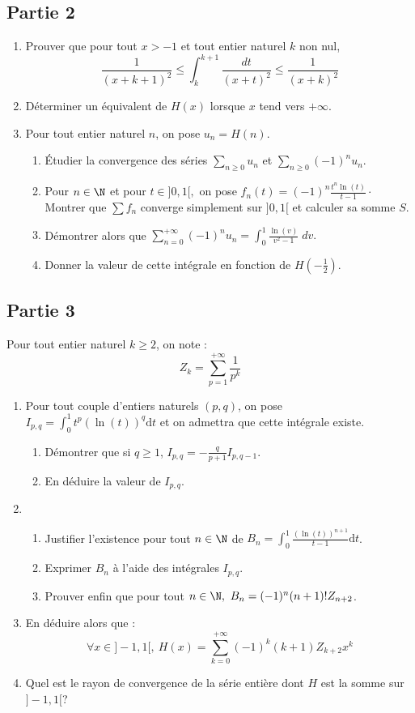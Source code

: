 \documentclass[twoside,french,11pt]{VcCours}
\newcommand{\dt}{\text{d}t}
\begin{document}
\subsection*{Partie 2}

\begin{enumerate}
\item Prouver que pour tout $x>-1$ et tout entier naturel $k$ non nul,
\[\frac{1}{(x+k+1)^2}\leq \int_k^{k+1}\frac{dt}{(x+t)^2}\leq \frac{1}{(x+k)^2}\]
\item Déterminer un équivalent de $H(x)$ lorsque $x$ tend vers $+\infty$.
\item Pour tout entier naturel $n$, on pose $u_n=H(n)$.
\begin{enumerate}
\item Étudier la convergence des séries $\sum_{n\geq 0}u_n$ et $\sum_{n\geq 0}(-1)^nu_n$.
\item Pour $n\in\N$ et pour $t\in]0,1[,$ on pose $f_n(t)=(-1)^n\frac{t^{n}\ln(t)}{t-1} \cdot$\\
Montrer que $\sum f_n$ converge simplement sur $]0,1[$ et calculer sa somme $S$.
\item Démontrer alors que
$\sum_{n=0}^{+\infty}(-1)^nu_n=\int_0^1\frac{\ln(v)}{v^2-1}\;dv.$
\item Donner la valeur de cette intégrale en fonction de $H\left (-\frac{1}{2}\right )$.
\end{enumerate}
\end{enumerate}

\subsection*{Partie 3}

Pour tout entier naturel $k\geq 2$, on note :
\[Z_k=\sum_{p=1}^{+\infty}\frac{1}{p^k}\]
\begin{enumerate}
\item Pour tout couple d'entiers naturels $(p,q)$, on pose $I_{p,q}=\int_0^1t^p(\ln(t))^q\dt$ et on admettra que cette intégrale existe.
\begin{enumerate}
\item Démontrer que si $q\geq 1$, $I_{p,q}=-\frac{q}{p+1}I_{p,q-1}$.
\item En déduire la valeur de $I_{p,q}$.
\end{enumerate}
\item
\begin{enumerate}
\item Justifier l'existence pour tout $n\in \N$ de $B_n=\int_0^1 \frac{(\ln(t))^{n+1}}{t-1}\dt$.
\item Exprimer $B_n$ à l'aide des intégrales $I_{p,q}$.

\item Prouver enfin que pour tout $n\in \N,\ B_n=(-1)^n(n+1)!Z_{n+2}$.
\end{enumerate}
\item En déduire alors que :
\[\forall x\in ]-1,1[,\ H(x)=\sum_{k=0}^{+\infty}(-1)^k(k+1)Z_{k+2}x^k\]
\item Quel est le rayon de convergence de la série entière dont $H$ est la somme sur $]-1,1[$?
\end{enumerate}
\end{document}
